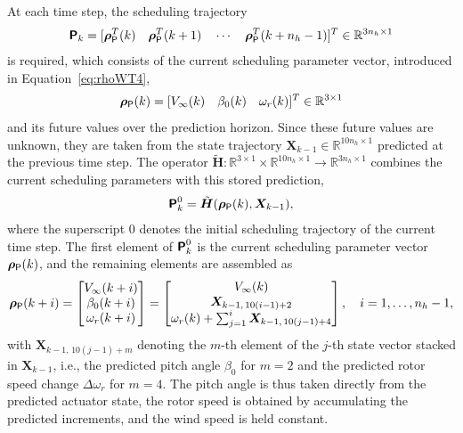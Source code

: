 At each time step, the scheduling trajectory
\begin{align*}
    \bm{\mathsf{P}}_{k} = [\bm{\rho}_{\mathsf{P}}^T(k) \quad \bm{\rho}_{\mathsf{P}}^T(k+1) \quad \cdots \quad \bm{\rho}_{\mathsf{P}}^T(k+n_h-1)]^T \in \mathbb{R}^{3n_h \times 1}
\end{align*}
is required, which consists of the current scheduling parameter vector, introduced in Equation~\eqref{eq:rhoWT4},
\begin{align*}
    \bm{\rho}_{\mathsf{P}}(k) = [V_\infty(k) \quad \beta_0(k) \quad \omega_r(k)]^T \in \mathbb{R}^{3 \times 1}
\end{align*}
and its future values over the prediction horizon. Since these future values are unknown, they are taken from the state trajectory $\bm{X}_{k-1} \in \mathbb{R}^{10 n_h \times 1}$ predicted at the previous time step. The operator $\tilde{\bm{H}}: \mathbb{R}^{3 \times 1} \times \mathbb{R}^{10 n_h \times 1} \to \mathbb{R}^{3 n_h \times 1}$ combines the current scheduling parameters with this stored prediction,
\begin{align*}
    \bm{\mathsf{P}}_k^0 = \tilde{\bm{H}}(\bm{\rho}_{\mathsf{P}}(k), \bm{X}_{k-1}),
\end{align*}
where the superscript $0$ denotes the initial scheduling trajectory of the current time step. The first element of $\bm{\mathsf{P}}_k^0$ is the current scheduling parameter vector $\bm{\rho}_{\mathsf{P}}(k)$, and the remaining elements are assembled as
\begin{align*}
    \bm{\rho}_{\mathsf{P}}(k+i) = \begin{bmatrix}
        V_\infty(k+i) \\
        \beta_{0}(k+i) \\
        \omega_r(k+i)
    \end{bmatrix} = \begin{bmatrix}
        V_\infty(k) \\
        \bm{X}_{k-1,\,10(i-1)+2} \\
        \omega_r(k) + \sum_{j=1}^{i} \bm{X}_{k-1,\,10(j-1)+4}
    \end{bmatrix}, \quad i = 1, \dots, n_h-1,
\end{align*}
with $\bm{X}_{k-1,\,10(j-1)+m}$ denoting the $m$-th element of the $j$-th state vector stacked in $\bm{X}_{k-1}$, i.e., the predicted pitch angle $\beta_0$ for $m = 2$ and the predicted rotor speed change $\Delta\omega_r$ for $m = 4$. The pitch angle is thus taken directly from the predicted actuator state, the rotor speed is obtained by accumulating the predicted increments, and the wind speed is held constant.

